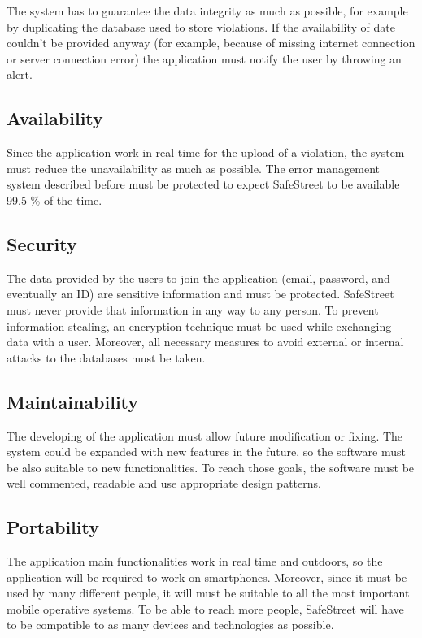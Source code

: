 \documentclass[../RASD.tex]{subfiles}
\begin{document}
            The system has to guarantee the data integrity as much as possible, for example by duplicating the database used to store violations.
            If the availability of date couldn’t be provided anyway (for example, because of missing internet connection or server connection error)
            the application must notify the user by throwing an alert.
            \subsection{Availability}\label{subsec:availability}
            Since the application work in real time for the upload of a violation, the system must reduce the unavailability as much as possible.
            The error management system described before must be protected to expect SafeStreet to be available 99.5 \% of the time.
            \subsection{Security}\label{subsec:security}
            The data provided by the users to join the application (email, password, and eventually an ID) are sensitive information and must be protected.
            SafeStreet must never provide that information in any way to any person. To prevent information stealing, an encryption technique must be used
            while exchanging data with a user. Moreover, all necessary measures to avoid external or internal attacks to the databases must be taken.
            \subsection{Maintainability}\label{subsec:maintainability}
            The developing of the application must allow future modification or fixing. The system could be expanded with new features in the future,
            so the software must be also suitable to new functionalities. To reach those goals, the software must be well commented, readable and use appropriate design patterns.
            \subsection{Portability}\label{subsec:portability}
            The application main functionalities work in real time and outdoors, so the application will be required to work on smartphones.
            Moreover, since it must be used by many different people, it will must be suitable to all the most important mobile operative systems.
            To be able to reach more people, SafeStreet will have to be compatible to as many devices and technologies as possible.
\end{document}
